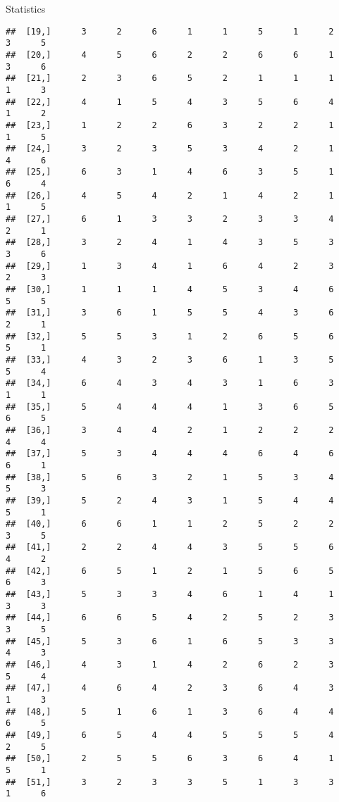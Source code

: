\documentclass[
  ignorenonframetext,
]{beamer}
\begin{document}
\begin{frame}[fragile]{Statistics}
\begin{verbatim}
##  [19,]      3      2      6      1      1      5      1      2      3      5
##  [20,]      4      5      6      2      2      6      6      1      3      6
##  [21,]      2      3      6      5      2      1      1      1      1      3
##  [22,]      4      1      5      4      3      5      6      4      1      2
##  [23,]      1      2      2      6      3      2      2      1      1      5
##  [24,]      3      2      3      5      3      4      2      1      4      6
##  [25,]      6      3      1      4      6      3      5      1      6      4
##  [26,]      4      5      4      2      1      4      2      1      1      5
##  [27,]      6      1      3      3      2      3      3      4      2      1
##  [28,]      3      2      4      1      4      3      5      3      3      6
##  [29,]      1      3      4      1      6      4      2      3      2      3
##  [30,]      1      1      1      4      5      3      4      6      5      5
##  [31,]      3      6      1      5      5      4      3      6      2      1
##  [32,]      5      5      3      1      2      6      5      6      5      1
##  [33,]      4      3      2      3      6      1      3      5      5      4
##  [34,]      6      4      3      4      3      1      6      3      1      1
##  [35,]      5      4      4      4      1      3      6      5      6      5
##  [36,]      3      4      4      2      1      2      2      2      4      4
##  [37,]      5      3      4      4      4      6      4      6      6      1
##  [38,]      5      6      3      2      1      5      3      4      5      3
##  [39,]      5      2      4      3      1      5      4      4      5      1
##  [40,]      6      6      1      1      2      5      2      2      3      5
##  [41,]      2      2      4      4      3      5      5      6      4      2
##  [42,]      6      5      1      2      1      5      6      5      6      3
##  [43,]      5      3      3      4      6      1      4      1      3      3
##  [44,]      6      6      5      4      2      5      2      3      3      5
##  [45,]      5      3      6      1      6      5      3      3      4      3
##  [46,]      4      3      1      4      2      6      2      3      5      4
##  [47,]      4      6      4      2      3      6      4      3      1      3
##  [48,]      5      1      6      1      3      6      4      4      6      5
##  [49,]      6      5      4      4      5      5      5      4      2      5
##  [50,]      2      5      5      6      3      6      4      1      5      1
##  [51,]      3      2      3      3      5      1      3      3      1      6

\end{verbatim}
\end{frame}
\end{document}
